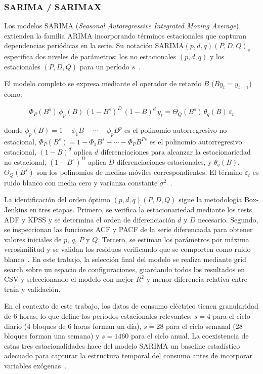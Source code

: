 \documentclass[12pt, a4paper]{article}
\begin{document}
\subsubsection{SARIMA / SARIMAX}

Los modelos SARIMA (\textit{Seasonal Autoregressive Integrated Moving Average}) extienden la familia ARIMA incorporando términos estacionales que capturan dependencias periódicas en la serie. Su notación SARIMA$(p, d, q)(P, D, Q)_s$ especifica dos niveles de parámetros: los no estacionales $(p, d, q)$ y los estacionales $(P, D, Q)$ para un período $s$~\cite{hyndman2021, boxjenkins2015}.

El modelo completo se expresa mediante el operador de retardo $B$ ($B y_t = y_{t-1}$) como:

\begin{equation}
\Phi_P(B^s)\,\phi_p(B)\,(1-B^s)^D\,(1-B)^d\, y_t = \Theta_Q(B^s)\,\theta_q(B)\,\varepsilon_t
\end{equation}

donde $\phi_p(B) = 1 - \phi_1 B - \cdots - \phi_p B^p$ es el polinomio autorregresivo no estacional, $\Phi_P(B^s) = 1 - \Phi_1 B^s - \cdots - \Phi_P B^{Ps}$ es el polinomio autorregresivo estacional, $(1-B)^d$ aplica $d$ diferenciaciones para alcanzar la estacionariedad no estacional, $(1-B^s)^D$ aplica $D$ diferenciaciones estacionales, y $\theta_q(B)$, $\Theta_Q(B^s)$ son los polinomios de medias móviles correspondientes. El término $\varepsilon_t$ es ruido blanco con media cero y varianza constante $\sigma^2$~\cite{hyndman2021}.

La identificación del orden óptimo $(p, d, q)(P, D, Q)$ sigue la metodología Box-Jenkins en tres etapas. Primero, se verifica la estacionariedad mediante los tests ADF y KPSS y se determina el orden de diferenciación $d$ y $D$ necesario. Segundo, se inspeccionan las funciones ACF y PACF de la serie diferenciada para obtener valores iniciales de $p$, $q$, $P$ y $Q$. Tercero, se estiman los parámetros por máxima verosimilitud y se validan los residuos verificando que se comporten como ruido blanco~\cite{hyndman2021, boxjenkins2015}. En este trabajo, la selección final del modelo se realiza mediante grid search sobre un espacio de configuraciones, guardando todos los resultados en CSV y seleccionando el modelo con mejor $R^2$ y menor diferencia relativa entre train y validación.

En el contexto de este trabajo, los datos de consumo eléctrico tienen granularidad de 6 horas, lo que define los períodos estacionales relevantes: $s = 4$ para el ciclo diario (4 bloques de 6 horas forman un día), $s = 28$ para el ciclo semanal (28 bloques forman una semana) y $s = 1460$ para el ciclo anual. La coexistencia de estas tres estacionalidades hace del modelo SARIMA un baseline estadístico adecuado para capturar la estructura temporal del consumo antes de incorporar variables exógenas~\cite{hyndman2021}.
\end{document}
